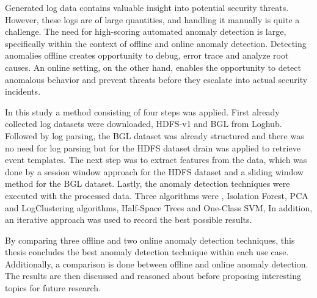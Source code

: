 
Generated log data contains valuable insight into potential security threats. However, these logs are of large quantities, and handling it manually is quite a challenge. The need for high-scoring automated anomaly detection is large, specifically within the context of offline and online anomaly detection. Detecting anomalies offline creates opportunity to debug, error trace and analyze root causes. An online setting, on the other hand, enables the opportunity to detect anomalous behavior and prevent threats before they escalate into actual security incidents.

In this study a method consisting of four steps was applied. First already collected log datasets were downloaded, HDFS-v1 and BGL from Loghub. Followed by log parsing, the BGL dataset was already structured and there was no need for log parsing but for the HDFS dataset  drain was applied to retrieve event templates. The next step was to extract features from the data, which was done by a session window approach for the HDFS dataset and a sliding window method for the BGL dataset. Lastly, the anomaly detection techniques were executed with the processed data. Three algorithms were , Isolation Forest, PCA and LogClustering algorithms, Half-Space Trees and One-Class SVM,   In addition, an iterative approach was used to record the best possible results.

By comparing three offline and two online anomaly detection techniques, this thesis concludes the best anomaly detection technique within each use case.  Additionally, a comparison is done between offline and online anomaly detection. The results are then discussed and reasoned about before proposing interesting topics for future research. 



